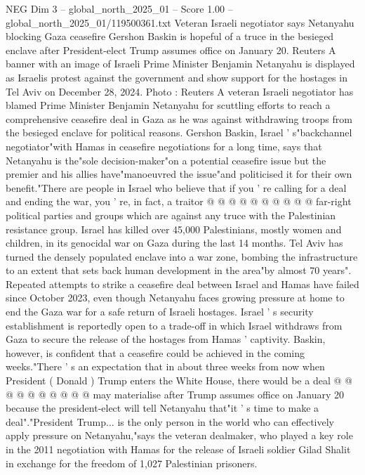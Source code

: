 \begin{textsample}{NEG Dim 3 – global\_north\_2025\_01 – Score 1.00 – global\_north\_2025\_01/119500361.txt}  \label{ex:f3_neg_213}
Veteran Israeli negotiator says Netanyahu blocking Gaza ceasefire Gershon Baskin is hopeful of a truce in the besieged enclave after President-elect Trump assumes office on January 20.
Reuters A banner with an image of Israeli Prime Minister Benjamin Netanyahu is displayed as Israelis protest against the government and show support for the hostages in Tel Aviv on December 28, 2024.
Photo : Reuters A veteran Israeli negotiator has blamed Prime Minister Benjamin Netanyahu for scuttling efforts to reach a comprehensive ceasefire deal in Gaza as he was against withdrawing troops from the besieged enclave for political reasons.
Gershon Baskin, Israel ' s"backchannel negotiator"with Hamas in ceasefire negotiations for a long time, says that Netanyahu is the"sole decision-maker"on a potential ceasefire issue but the premier and his allies have"manoeuvred the issue"and politicised it for their own benefit."There are people in Israel who believe that if you ' re calling for a deal and ending the war, you ' re, in fact, a traitor @ @ @ @ @ @ @ @ @ @ far-right political parties and groups which are against any truce with the Palestinian resistance group.
Israel has killed over 45,000 Palestinians, mostly women and children, in its genocidal war on Gaza during the last 14 months.
Tel Aviv has turned the densely populated enclave into a war zone, bombing the infrastructure to an extent that sets back human development in the area"by almost 70 years".
Repeated attempts to strike a ceasefire deal between Israel and Hamas have failed since October 2023, even though Netanyahu faces growing pressure at home to end the Gaza war for a safe return of Israeli hostages.
Israel ' s security establishment is reportedly open to a trade-off in which Israel withdraws from Gaza to secure the release of the hostages from Hamas ' captivity.
Baskin, however, is confident that a ceasefire could be achieved in the coming weeks."There ' s an expectation that in about three weeks from now when President ( Donald ) Trump enters the White House, there would be a deal @ @ @ @ @ @ @ @ @ @ may materialise after Trump assumes office on January 20 because the president-elect will tell Netanyahu that"it ' s time to make a deal"."President Trump... is the only person in the world who can effectively apply pressure on Netanyahu,"says the veteran dealmaker, who played a key role in the 2011 negotiation with Hamas for the release of Israeli soldier Gilad Shalit in exchange for the freedom of 1,027 Palestinian prisoners.

\end{textsample}
